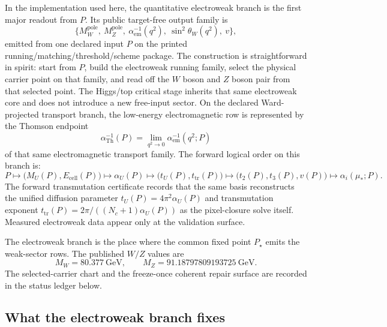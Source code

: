 \documentclass[11pt]{article}
\begin{document}
In the implementation used here, the quantitative electroweak branch is the first major readout from \(P\). Its public
target-free output family is
\[
\{M_W^{\mathrm{pole}},\ M_Z^{\mathrm{pole}},\ \alpha_{\mathrm{em}}^{-1}(q^2),\ \sin^2\theta_W(q^2),\ v\},
\]
emitted from one declared input \(P\) on the printed running/matching/threshold/scheme package. The construction
is straightforward in spirit: start from \(P\), build the electroweak running family, select the physical carrier point on that family, and read off the \(W\) boson and \(Z\) boson pair from that selected point. The Higgs/top critical stage
inherits that same electroweak core and does not introduce a new
free-input sector. On the declared Ward-projected transport branch, the low-energy electromagnetic row is represented by the Thomson endpoint
\[
\alpha_{\mathrm{Th}}^{-1}(P)=\lim_{q^2\to 0}\alpha_{\mathrm{em}}^{-1}(q^2;P)
\]
of that same electromagnetic transport family.
The forward logical order on this branch is:
\[
P
\longmapsto
\bigl(M_U(P),E_{\mathrm{cell}}(P)\bigr)
\longmapsto
\alpha_U(P)
\longmapsto
\bigl(t_U(P),t_{\mathrm{tr}}(P)\bigr)
\longmapsto
\bigl(t_2(P),t_3(P),v(P)\bigr)
\longmapsto
\alpha_i(\mu_\ast;P).
\]
The forward transmutation certificate records that the same basis reconstructs the unified diffusion parameter \(t_U(P)=4\pi^2\alpha_U(P)\) and transmutation exponent \(t_{\mathrm{tr}}(P)=2\pi/((N_c+1)\alpha_U(P))\) as the pixel-closure solve itself. Measured electroweak data appear only at the validation surface.

The electroweak branch is the place where the common fixed point \(P_\star\) emits the weak-sector rows. The
published \(W/Z\) values are
\[
M_W=80.377~\mathrm{GeV},
\qquad
M_Z=91.18797809193725~\mathrm{GeV}.
\]
The selected-carrier chart and the freeze-once coherent repair surface are recorded in the status
ledger below.

\subsection{What the electroweak branch fixes}
\end{document}
